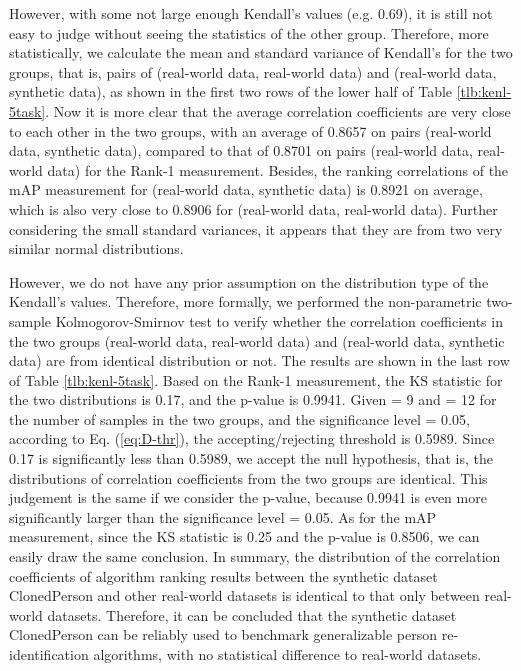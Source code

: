 \documentclass[10pt,twocolumn,letterpaper]{article}
\begin{document}
However, with some not large enough Kendall's  values (e.g. 0.69), it is still not easy to judge without seeing the statistics of the other group. Therefore, more statistically, we calculate the mean and standard variance of Kendall's  for the two groups, that is, pairs of (real-world data, real-world data) and (real-world data, synthetic data), as shown in the first two rows of the lower half of Table \ref{tlb:kenl-5task}. Now it is more clear that the average correlation coefficients are very close to each other in the two groups, with an average of 0.8657 on pairs (real-world data, synthetic data), compared to that of 0.8701 on pairs (real-world data, real-world data) for the Rank-1 measurement. Besides, the ranking correlations of the mAP measurement for (real-world data, synthetic data) is 0.8921 on average, which is also very close to 0.8906 for (real-world data, real-world data). Further considering the small standard variances, it appears that they are from two very similar normal distributions.

However, we do not have any prior assumption on the distribution type of the Kendall's  values. Therefore, more formally, we performed the non-parametric two-sample Kolmogorov-Smirnov test to verify whether the correlation coefficients in the two groups (real-world data, real-world data) and (real-world data, synthetic data) are from identical distribution or not. The results are shown in the last row of Table \ref{tlb:kenl-5task}. Based on the Rank-1 measurement, the KS statistic for the two distributions is 0.17, and the p-value is 0.9941. Given  = 9 and  = 12 for the number of samples in the two groups, and the significance level  = 0.05, according to Eq. (\ref{eq:D-thr}), the accepting/rejecting threshold is 0.5989. Since 0.17 is significantly less than 0.5989, we accept the null hypothesis, that is, the distributions of correlation coefficients from the two groups are identical. This judgement is the same if we consider the p-value, because 0.9941 is even more significantly larger than the significance level  = 0.05. 
As for the mAP measurement, since the KS statistic is 0.25 and the p-value is 0.8506, we can easily draw the same conclusion. In summary, the distribution of the correlation coefficients of algorithm ranking results between the synthetic dataset ClonedPerson and other real-world datasets is identical to that only between real-world datasets. Therefore, it can be concluded that the synthetic dataset ClonedPerson can be reliably used to benchmark generalizable person re-identification algorithms, with no statistical difference to real-world datasets.
\end{document}
